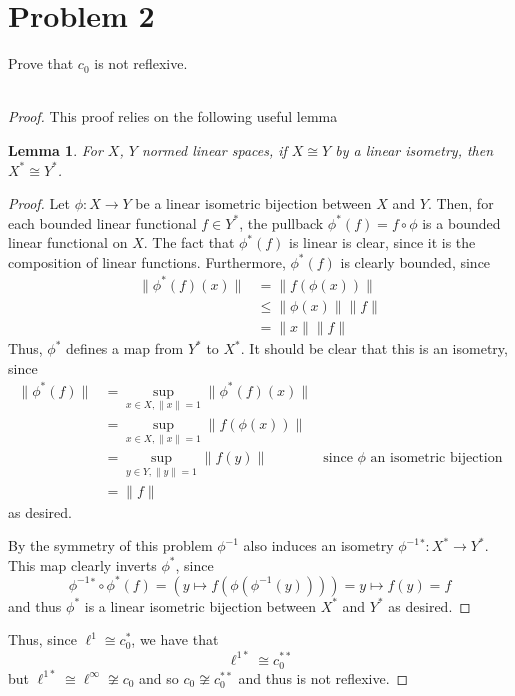 \documentclass[fontsize=11pt]{scrartcl} %
\numberwithin{equation}{section} %
\numberwithin{figure}{section} %
\numberwithin{table}{section} %
\newtheorem{lemma}{Lemma}
\begin{document}
\newpage

\section*{Problem 2}
Prove that $c_0$ is not reflexive.
\\
\\
\begin{proof}
    This proof relies on the following useful lemma
    \begin{lemma}
        For $X$, $Y$ normed linear spaces, if $X\cong Y$ by a linear isometry,
        then $X^*\cong Y^*$.
    \end{lemma}
    \begin{proof}
        Let $\phi:X\to Y$ be a linear isometric bijection between $X$ and $Y$.
        Then, for each bounded linear functional $f\in Y^*$, the pullback
        $\phi^*(f) = f\circ\phi$ is a bounded linear functional on $X$. The fact
        that $\phi^*(f)$ is linear is clear, since it is the composition of
        linear functions. Furthermore, $\phi^*(f)$ is clearly bounded, since
        \[
            \begin{aligned}
                \|\phi^*(f)(x)\| &= \|f(\phi(x))\|\\
                &\leq \|\phi(x)\|\|f\|\\
                &=\|x\|\|f\|
            \end{aligned}
        \]
        Thus, $\phi^*$ defines a map from $Y^*$ to $X^*$. It should be clear
        that this is an isometry, since
        \[
\begin{aligned}
    \|\phi^*(f)\| &= \sup_{x\in X,\|x\|=1} \|\phi^*(f)(x)\|\\
    &= \sup_{x\in X,\|x\|=1} \|f(\phi(x))\|\\
    &= \sup_{y\in Y, \|y\|=1} \|f(y)\| &\text{since $\phi$ an isometric
    bijection}\\
    &= \|f\|
\end{aligned}
        \]
        as desired.

        By the symmetry of this problem $\phi^{-1}$ also induces an isometry
        $\phi^{-1}{}^*:X^*\to Y^*$. This map clearly inverts $\phi^*$, since
        \[
            \phi^{-1}{}^*\circ\phi^*(f) = (y\mapsto f(\phi(\phi^{-1}(y)))) =
            y\mapsto f(y) = f
        \]
        and thus $\phi^*$ is a linear isometric bijection between $X^*$ and
        $Y^*$ as desired.
    \end{proof}

    Thus, since $\ell^1\cong c_0^*$, we have that
    \[
        \ell^{1*}\cong c_0^{**}
    \]
    but $\ell^{1*}\cong \ell^{\infty}\not\cong c_0$ and so $c_0\not\cong
    c_0^{**}$ and thus is not reflexive.
\end{proof}
\end{document}
